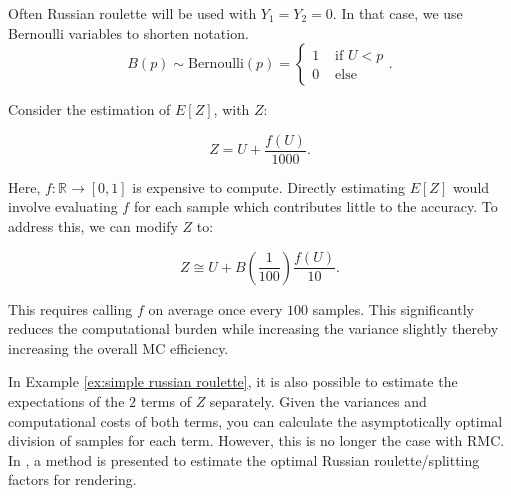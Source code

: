 \documentclass[a4paper,12pt]{article}
\begin{document}
\begin{notation}[$B(p)$]
  Often Russian roulette will be used with $Y_{1}= Y_{2}= 0$.
  In that case, we use Bernoulli variables to shorten notation.
  \begin{equation}
    B(p) \sim \text{Bernoulli}(p) =
    \begin{cases}
      1 & \text{ if } U<p \\
      0 & \text{ else }
    \end{cases} .
  \end{equation}
\end{notation}

\begin{example} \label{ex:simple russian roulette}
  Consider the estimation of $E[Z]$, with $Z$:

  \begin{equation}
    Z = U + \frac{f(U)}{1000}.
  \end{equation}

  Here, $f:\mathbb{R} \rightarrow [0,1]$ is expensive to compute.
  Directly estimating $E[Z]$ would involve evaluating $f$ for each sample which
  contributes little to the accuracy.
  To address this, we can modify $Z$ to:

  \begin{equation}
    Z \cong U + B\left(\frac{1}{100}\right)\frac{f(U)}{10}.
  \end{equation}

  This requires calling $f$ on
  average once every $100$ samples. This significantly reduces the
  computational burden while increasing the variance slightly thereby increasing
  the overall MC efficiency.\\
\end{example}

\begin{related}
  In Example \ref{ex:simple russian roulette}, it is also
  possible to estimate the expectations of the $2$ terms
  of $Z$ separately. Given the variances and computational costs
  of both terms, you can calculate the asymptotically optimal division
  of samples for each term. However, this is no longer the case with RMC.
  In \cite{rath_ears_2022}, a method is presented to estimate the optimal
  Russian roulette/splitting factors for rendering.
\end{related}
\end{document}

